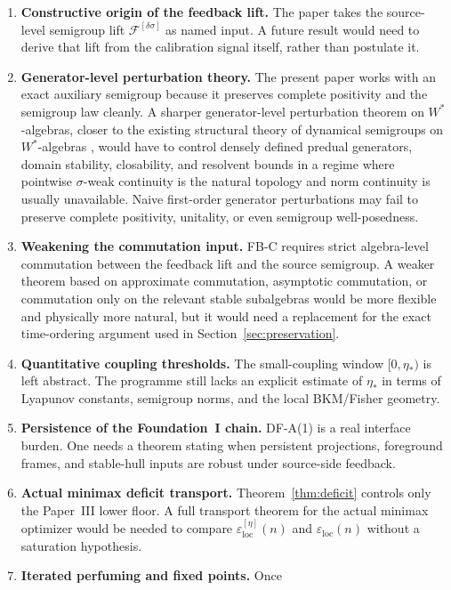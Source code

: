 \documentclass[12pt]{article}
\theoremstyle{definition}
\theoremstyle{remark}
\begin{document}
\begin{enumerate}
\item \textbf{Constructive origin of the feedback lift.} The paper takes
  the source-level semigroup lift
  \(\mathscr F^{[\delta\sigma]}\) as named input. A future result would
  need to derive that lift from the calibration signal itself, rather
  than postulate it.
\item \textbf{Generator-level perturbation theory.} The present paper
  works with an exact auxiliary semigroup because it preserves complete
  positivity and the semigroup law cleanly. A sharper generator-level
  perturbation theorem on \(W^*\)-algebras, closer to the existing
  structural theory of dynamical semigroups on \(W^*\)-algebras
  \cite{FrigerioVerri1982}, would have to control densely defined
  predual generators, domain stability, closability, and resolvent
  bounds in a regime where pointwise \(\sigma\)-weak continuity is the
  natural topology and norm continuity is usually unavailable. Naive
  first-order generator perturbations may fail to preserve complete
  positivity, unitality, or even semigroup well-posedness.
\item \textbf{Weakening the commutation input.} FB-C requires strict
  algebra-level commutation between the feedback lift and the source
  semigroup. A weaker theorem based on approximate commutation,
  asymptotic commutation, or commutation only on the relevant stable
  subalgebras would be more flexible and physically more natural, but it
  would need a replacement for the exact time-ordering argument used in
  Section~\ref{sec:preservation}.
\item \textbf{Quantitative coupling thresholds.} The small-coupling
  window \([0,\eta_*)\) is left abstract. The programme still lacks an
  explicit estimate of \(\eta_*\) in terms of Lyapunov constants,
  semigroup norms, and the local BKM/Fisher geometry.
\item \textbf{Persistence of the Foundation~I chain.} DF-A(1) is a real
  interface burden. One needs a theorem stating when persistent
  projections, foreground frames, and stable-hull inputs are robust
  under source-side feedback.
\item \textbf{Actual minimax deficit transport.} Theorem~\ref{thm:deficit}
  controls only the Paper~III lower floor. A full transport theorem for
  the actual minimax optimizer would be needed to compare
  \(\varepsilon_{\mathrm{loc}}^{[\eta]}(n)\) and
  \(\varepsilon_{\mathrm{loc}}(n)\) without a saturation hypothesis.
\item \textbf{Iterated perfuming and fixed points.} Once

\end{enumerate}
\end{document}
